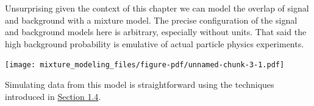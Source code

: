 \documentclass[
  letterpaper,
  DIV=11,
  numbers=noendperiod]{scrartcl}
\newenvironment{Shaded}{\begin{snugshade}}{\end{snugshade}}
\newcommand{\AttributeTok}[1]{\textcolor[rgb]{0.40,0.45,0.13}{#1}}
\newcommand{\DecValTok}[1]{\textcolor[rgb]{0.68,0.00,0.00}{#1}}
\newcommand{\FloatTok}[1]{\textcolor[rgb]{0.68,0.00,0.00}{#1}}
\newcommand{\FunctionTok}[1]{\textcolor[rgb]{0.28,0.35,0.67}{#1}}
\newcommand{\NormalTok}[1]{\textcolor[rgb]{0.00,0.23,0.31}{#1}}
\newcommand{\OtherTok}[1]{\textcolor[rgb]{0.00,0.23,0.31}{#1}}
\newcommand{\SpecialCharTok}[1]{\textcolor[rgb]{0.37,0.37,0.37}{#1}}
\newcommand{\StringTok}[1]{\textcolor[rgb]{0.13,0.47,0.30}{#1}}
\begin{document}
Unsurprising given the context of this chapter we can model the overlap
of signal and background with a mixture model. The precise configuration
of the signal and background models here is arbitrary, especially
without units. That said the high background probability is emulative of
actual particle physics experiments.

\begin{Shaded}
\end{Shaded}

\texttt{[image: mixture\_modeling\_files/figure-pdf/unnamed-chunk-3-1.pdf]}

Simulating data from this model is straightforward using the techniques
introduced in \hyperref[sec:sampling]{Section 1.4}.
\end{document}
